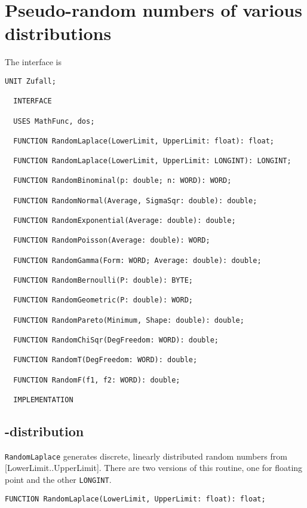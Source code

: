 \chapter{Pseudo-random numbers of various distributions}
\begin{refsection}



The interface is
\begin{lstlisting}[caption=Interface of unit RandomNumbers]
  UNIT Zufall;

  INTERFACE

  USES MathFunc, dos;

  FUNCTION RandomLaplace(LowerLimit, UpperLimit: float): float;

  FUNCTION RandomLaplace(LowerLimit, UpperLimit: LONGINT): LONGINT;

  FUNCTION RandomBinominal(p: double; n: WORD): WORD;

  FUNCTION RandomNormal(Average, SigmaSqr: double): double;

  FUNCTION RandomExponential(Average: double): double;

  FUNCTION RandomPoisson(Average: double): WORD;

  FUNCTION RandomGamma(Form: WORD; Average: double): double;

  FUNCTION RandomBernoulli(P: double): BYTE;

  FUNCTION RandomGeometric(P: double): WORD;

  FUNCTION RandomPareto(Minimum, Shape: double): double;

  FUNCTION RandomChiSqr(DegFreedom: WORD): double;

  FUNCTION RandomT(DegFreedom: WORD): double;

  FUNCTION RandomF(f1, f2: WORD): double;

  IMPLEMENTATION
\end{lstlisting}

\section{-distribution}

\texttt{RandomLaplace} generates discrete, linearly distributed random numbers from [LowerLimit..UpperLimit]. There are two versions of this routine, one for floating point and the other \texttt{LONGINT}.
\begin{lstlisting}[caption=Laplace-distributed random numbers]
  FUNCTION RandomLaplace(LowerLimit, UpperLimit: float): float;


\end{lstlisting}
\end{refsection}

